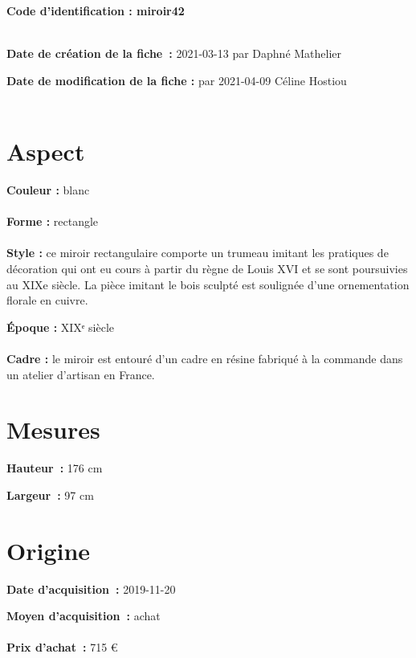  
    
    
    {\bf \huge Code d’identification : miroir42}
    \\ \\ \hr
    \begin{center}
    \end{center}
    
    {\bf \large Date de création de la fiche :} 2021-03-13
    {par Daphné Mathelier}
  
    {\bf \large Date de modification de la fiche :} 
    {par 2021-04-09}
    Céline Hostiou \\ \\ \hr
    \section* {Aspect}
   {\bf \large Couleur :} blanc
    \\ \\ {\bf \large Forme :}  rectangle
    \\ \\ {\bf \large Style :} ce miroir rectangulaire comporte un trumeau imitant les
            pratiques de décoration qui ont eu cours à partir du règne de Louis XVI et se sont poursuivies au XIXe siècle. La pièce imitant le bois sculpté est soulignée d'une
            ornementation florale en cuivre.
        
        {\bf \large Époque :} XIXᵉ siècle
    \\ \\ {\bf \large Cadre :} le miroir est entouré d'un cadre en résine fabriqué à la commande dans un atelier d’artisan en France.
        
    \section* {Mesures}
      
  {\bf \large Hauteur :} 176 cm
   
   {\bf \large Largeur :} 97 cm
     
    \section* {Origine}
    {\bf \large Date d’acquisition :} 2019-11-20

    {\bf \large Moyen d’acquisition :} achat
          \\ \\{\bf \large Prix d’achat :} 715 €
        
